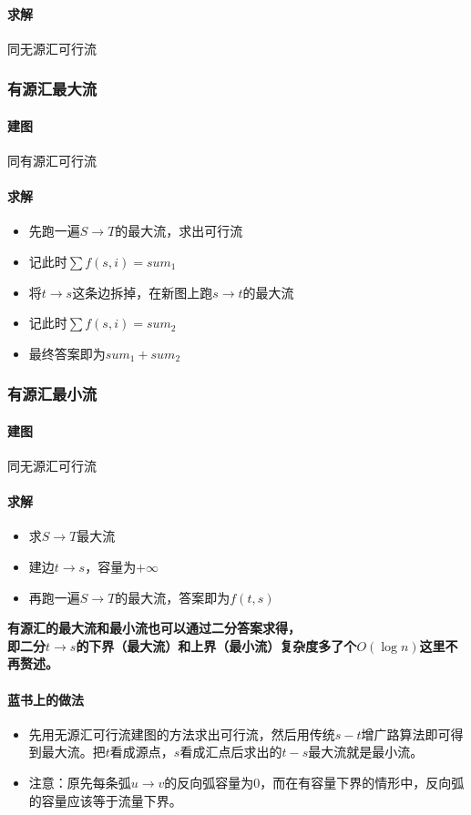 \paragraph{求解} 同无源汇可行流

\subsubsection*{有源汇最大流}
\paragraph{建图} 同有源汇可行流
\paragraph{求解}
\begin{itemize}
\item 先跑一遍$S \rightarrow T$的最大流，求出可行流
\item 记此时$\sum f(s,i) = sum_1$
\item 将$t \rightarrow s$这条边拆掉，在新图上跑$s \rightarrow t$的最大流
\item 记此时$\sum f(s,i) = sum_2$
\item 最终答案即为$sum_1 + sum_2$
\end{itemize}

\subsubsection*{有源汇最小流}
\paragraph{建图} 同无源汇可行流
\paragraph{求解}
\begin{itemize}
\item 求$S \rightarrow T$最大流
\item 建边$t \rightarrow s$，容量为$+\infty$
\item 再跑一遍$S \rightarrow T$的最大流，答案即为$f(t,s)$
\end{itemize}

\textbf{有源汇的最大流和最小流也可以通过二分答案求得，\\即二分$t \rightarrow s$的下界（最大流）和上界（最小流）复杂度多了个$O(\log n)$这里不再赘述。}

\paragraph{蓝书上的做法}
\begin{itemize}
\item 先用无源汇可行流建图的方法求出可行流，然后用传统$s-t$增广路算法即可得到最大流。把$t$看成源点，$s$看成汇点后求出的$t-s$最大流就是最小流。
\item 注意：原先每条弧$u \rightarrow v$的反向弧容量为$0$，而在有容量下界的情形中，反向弧的容量应该等于流量下界。
\end{itemize}

